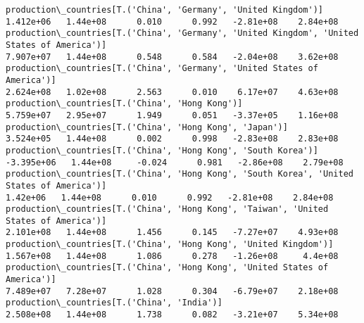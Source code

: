 \documentclass[11pt]{article}
\begin{document}
\begin{Verbatim}[commandchars=\\\{\}]
production\_countries[T.('China', 'Germany', 'United Kingdom')]                                                                                                                         1.412e+06   1.44e+08      0.010      0.992   -2.81e+08    2.84e+08
production\_countries[T.('China', 'Germany', 'United Kingdom', 'United States of America')]                                                                                             7.907e+07   1.44e+08      0.548      0.584   -2.04e+08    3.62e+08
production\_countries[T.('China', 'Germany', 'United States of America')]                                                                                                               2.624e+08   1.02e+08      2.563      0.010    6.17e+07    4.63e+08
production\_countries[T.('China', 'Hong Kong')]                                                                                                                                         5.759e+07   2.95e+07      1.949      0.051   -3.37e+05    1.16e+08
production\_countries[T.('China', 'Hong Kong', 'Japan')]                                                                                                                                3.524e+05   1.44e+08      0.002      0.998   -2.83e+08    2.83e+08
production\_countries[T.('China', 'Hong Kong', 'South Korea')]                                                                                                                         -3.395e+06   1.44e+08     -0.024      0.981   -2.86e+08    2.79e+08
production\_countries[T.('China', 'Hong Kong', 'South Korea', 'United States of America')]                                                                                               1.42e+06   1.44e+08      0.010      0.992   -2.81e+08    2.84e+08
production\_countries[T.('China', 'Hong Kong', 'Taiwan', 'United States of America')]                                                                                                   2.101e+08   1.44e+08      1.456      0.145   -7.27e+07    4.93e+08
production\_countries[T.('China', 'Hong Kong', 'United Kingdom')]                                                                                                                       1.567e+08   1.44e+08      1.086      0.278   -1.26e+08     4.4e+08
production\_countries[T.('China', 'Hong Kong', 'United States of America')]                                                                                                             7.489e+07   7.28e+07      1.028      0.304   -6.79e+07    2.18e+08
production\_countries[T.('China', 'India')]                                                                                                                                             2.508e+08   1.44e+08      1.738      0.082   -3.21e+07    5.34e+08

\end{Verbatim}
\end{document}

